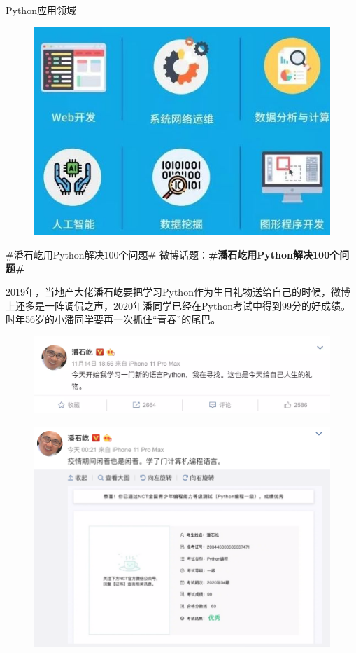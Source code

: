 \documentclass[11pt]{beamer}
\begin{document}
\begin{frame}{Python应用领域}
	\begin{figure}
		\centering
		\includegraphics[width=0.8\linewidth]{figures/python-field}
		\label{fig:python-field}
	\end{figure}
\end{frame}

\begin{frame}[allowframebreaks]{\#潘石屹用Python解决100个问题\#}
	微博话题：\textbf{\#潘石屹用Python解决100个问题\#}\cite{panshiyi100}

	2019年，当地产大佬潘石屹要把学习Python作为生日礼物送给自己的时候，微博上还多是一阵调侃之声，2020年潘同学已经在Python考试中得到99分的好成绩。时年56岁的小潘同学要再一次抓住“青春”的尾巴。
	\begin{figure}
		\centering
		\includegraphics[width=0.7\linewidth]{figures/pythonPanshiyi01}
		\label{fig:pythonpanshiyi01}
	\end{figure}

	\begin{figure}
		\centering
		\includegraphics[width=0.8\linewidth]{figures/pythonPanshiyi03}
		\label{fig:pythonpanshiyi03}
	\end{figure}
\end{frame}
\end{document}
